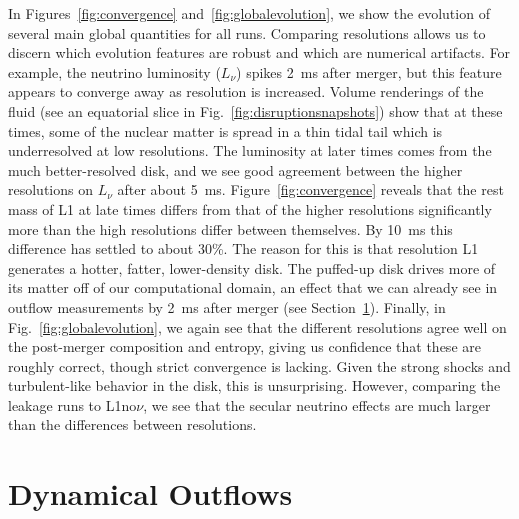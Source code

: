 In Figures~\ref{fig:convergence} and~\ref{fig:globalevolution},
we show the evolution of several main global quantities for all runs. 
Comparing resolutions allows us to discern
which evolution features are robust and which are numerical artifacts. 
For example, the neutrino luminosity ($L_{\nu}$) spikes 2~ms after merger,
but this feature appears to converge away as resolution is increased.
Volume renderings of the fluid (see an equatorial slice in Fig.~\ref{fig:disruptionsnapshots})
show that at these times, some of the nuclear matter is spread in
a thin tidal tail which is underresolved at low resolutions. The luminosity
at later times comes from the much better-resolved disk, and we see
good agreement between the higher resolutions on $L_{\nu}$ after
about 5~ms.
Figure~\ref{fig:convergence} reveals that the rest mass
of L1 at late times differs from that of the higher resolutions significantly
more than the high resolutions differ between themselves.
By 10~ms this difference has settled to about 30\%.
The reason for this is that resolution L1 generates a hotter, fatter,
lower-density disk.
The puffed-up disk drives more of its matter off of our computational domain,
an effect that we can already see in outflow measurements by 2~ms after merger
(see Section~\ref{sec:outflow}).
Finally, in Fig.~\ref{fig:globalevolution}, we again see that the different
resolutions agree well on the post-merger composition and entropy,
giving us confidence that these are roughly correct, though
strict convergence is lacking.  Given the strong shocks and
turbulent-like behavior in the disk, this is unsurprising.
However, comparing the leakage runs to L1no$\nu$, we see that the secular
neutrino effects are much larger than the differences between resolutions.

\section{Dynamical Outflows}
\label{sec:outflow}

